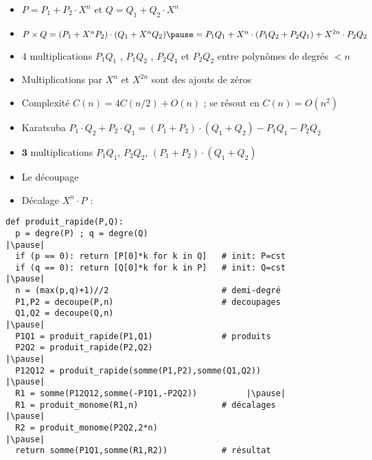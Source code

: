 \begin{frame}[fragile]

\begin{itemize}
  \item $P = P_1 + P_2 \cdot X^n$ et $Q = Q_1 + Q_2 \cdot X^n$
\pause
  \item $P \times Q = (P_1 + X^n P_2 ) \cdot (Q_1 + X^n Q_2 ) 
  \pause = P_1 Q_1 + X^n \cdot (P_1 Q_2 + P_2 Q_1 ) + X^{2n} \cdot P_2 Q_2$
\pause
  \item $4$ multiplications $P_1 Q_1$ , $P_1 Q_2$ , $P_2 Q_1$ et $P_2 Q_2$ 
  entre polynômes de degrés $<n$
\pause  
  \item Multiplications par $X^n$ et $X^{2n}$ sont des ajouts de zéros
\pause  
  \item Complexité $C(n) = 4C(n/2)+O(n)$ ; se résout en $C(n) = O(n^2)$
\pause
  \item Karatsuba \pause $P_1 \cdot Q_2 + P_2 \cdot Q_1 = (P_1 + P_2 ) \cdot (Q_1 + Q_2 ) - P_1 Q_1 - P_2 Q_2$
 \pause 
  \item $\mathbf{3}$ multiplications $P_1 Q_1$, $P_2 Q_2$, $(P_1 + P_2 ) \cdot (Q_1 + Q_2 )$
\pause 
  \item Le découpage 
\pause  
  \item Décalage $X^n \cdot P$ :  
\end{itemize}

\end{frame}


\begin{frame}[fragile]


\begin{algo}[polynome.py (4)]
\begin{lstlisting}
def produit_rapide(P,Q):
  p = degre(P) ; q = degre(Q)                                  |\pause|
  if (p == 0): return [P[0]*k for k in Q]   # init: P=cst       
  if (q == 0): return [Q[0]*k for k in P]   # init: Q=cst      |\pause|
  n = (max(p,q)+1)//2                       # demi-degré
  P1,P2 = decoupe(P,n)                      # decoupages
  Q1,Q2 = decoupe(Q,n)                                                 |\pause|
  P1Q1 = produit_rapide(P1,Q1)              # produits
  P2Q2 = produit_rapide(P2,Q2)                                         |\pause|
  P12Q12 = produit_rapide(somme(P1,P2),somme(Q1,Q2))                       |\pause|
  R1 = somme(P12Q12,somme(-P1Q1,-P2Q2))          |\pause|
  R1 = produit_monome(R1,n)                 # décalages                  |\pause|
  R2 = produit_monome(P2Q2,2*n)                                          |\pause|
  return somme(P1Q1,somme(R1,R2))           # résultat                    
\end{lstlisting}  
\end{algo}

\end{frame}


